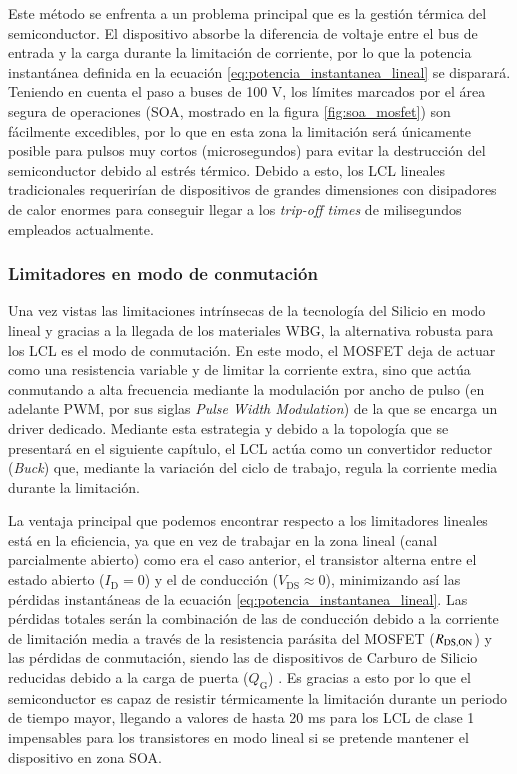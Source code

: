 \documentclass[12pt]{report} %
\begin{document}
Este método se enfrenta a un problema principal que es la gestión térmica del semiconductor. El dispositivo absorbe la diferencia de voltaje entre el bus de entrada y la carga durante la limitación de corriente, por lo que la potencia instantánea definida en la ecuación \ref{eq:potencia_instantanea_lineal} se disparará. Teniendo en cuenta el paso a buses de 100 V, los límites marcados por el área segura de operaciones (SOA, mostrado en la figura \ref{fig:soa_mosfet}) son fácilmente excedibles, por lo que en esta zona la limitación será únicamente posible para pulsos muy cortos (microsegundos) para evitar la destrucción del semiconductor debido al estrés térmico. Debido a esto, los LCL lineales tradicionales requerirían de dispositivos de grandes dimensiones con disipadores de calor enormes para conseguir llegar a los \textit{trip-off times} de milisegundos empleados actualmente. 

\subsubsection{Limitadores en modo de conmutación}
Una vez vistas las limitaciones intrínsecas de la tecnología del Silicio en modo lineal y gracias a la llegada de los materiales WBG, la alternativa robusta para los LCL es el modo de conmutación. En este modo, el MOSFET deja de actuar como una resistencia variable y de limitar la corriente extra, sino que actúa conmutando a alta frecuencia mediante la modulación por ancho de pulso (en adelante PWM, por sus siglas \textit{Pulse Width Modulation}) de la que se encarga un driver dedicado. Mediante esta estrategia y debido a la topología que se presentará en el siguiente capítulo, el LCL actúa como un convertidor reductor (\textit{Buck}) que, mediante la variación del ciclo de trabajo, regula la corriente media durante la limitación. 

La ventaja principal que podemos encontrar respecto a los limitadores lineales está en la eficiencia, ya que en vez de trabajar en la zona lineal (canal parcialmente abierto) como era el caso anterior, el transistor alterna entre el estado abierto ($I_\text{D} = 0$) y el de conducción ($V_\text{DS} \approx 0$), minimizando así las pérdidas instantáneas de la ecuación \ref{eq:potencia_instantanea_lineal}. 
Las pérdidas totales serán la combinación de las de conducción debido a la corriente de limitación media a través de la resistencia parásita del MOSFET ($R_{\text{DS,ON}}$) y las pérdidas de conmutación, siendo las de dispositivos de Carburo de Silicio reducidas debido a la carga de puerta ($Q_\text{G}$) \cite{lopez_antuna_diseno_2024}. Es gracias a esto por lo que el semiconductor es capaz de resistir térmicamente la limitación durante un periodo de tiempo mayor, llegando a valores de hasta 20 ms para los LCL de clase 1 \cite{european_cooperation_for_space_standardization_ecss_ecss-e-st-20-20c_2016} impensables para los transistores en modo lineal si se pretende mantener el dispositivo en zona SOA.
\end{document}
